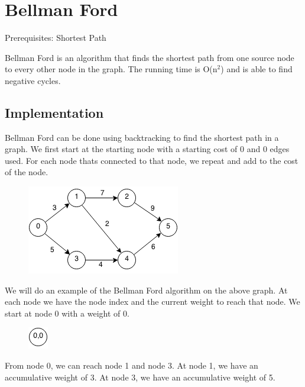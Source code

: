 \documentclass[11pt,oneside]{book}
\makeatletter
\def\maxwidth#1{\ifdim\Gin@nat@width>#1 #1\else\Gin@nat@width\fi}
\makeatother
\begin{document}
        \section{ Bellman Ford }
        

Prerequisites:  Shortest Path

Bellman Ford is an algorithm that finds the shortest path from one source node to every other node in the graph. The running time is O(n$^{2}$) and is able to find negative cycles.

\subsection{Implementation}

Bellman Ford can be done using backtracking to find the shortest path in a graph. We first start at the starting node with a starting cost of 0 and 0 edges used. For each node thats connected to that node, we repeat and add to the cost of the node.

\vspace{5px}\begin{figure}[H]\centering
        \includegraphics[width=0.66\maxwidth{\textwidth}]{bellmanford.png}
        \end{figure}

We will do an example of the Bellman Ford algorithm on the above graph. At each node we have the node index and the current weight to reach that node. We start at node 0 with a weight of 0.

\vspace{5px}\begin{figure}[H]\centering
        \includegraphics[width=0.66\maxwidth{\textwidth}]{bellmanford2.png}
        \end{figure}

From node 0, we can reach node 1 and node 3. At node 1, we have an accumulative weight of 3. At node 3, we have an accumulative weight of 5.
\end{document}
